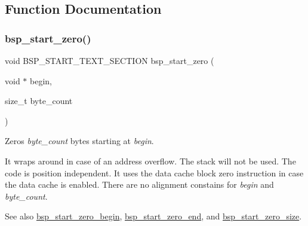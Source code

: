 \subsection{Function Documentation}
\mbox{\label{group__RTEMSBSPsPowerPCSharedStart_ga22b00d272dd9b2ab44e34f0b86245c38}} 
\subsubsection{\texorpdfstring{bsp\_start\_zero()}{bsp\_start\_zero()}}
{\footnotesize\ttfamily void B\+S\+P\+\_\+\+S\+T\+A\+R\+T\+\_\+\+T\+E\+X\+T\+\_\+\+S\+E\+C\+T\+I\+ON bsp\+\_\+start\+\_\+zero (\begin{DoxyParamCaption}\item[{void $\ast$}]{begin,  }\item[{size\+\_\+t}]{byte\+\_\+count }\end{DoxyParamCaption})}

Zeros {\itshape byte\+\_\+count} bytes starting at {\itshape begin}.

It wraps around in case of an address overflow. The stack will not be used. The code is position independent. It uses the data cache block zero instruction in case the data cache is enabled. There are no alignment constains for {\itshape begin} and {\itshape byte\+\_\+count}.

\begin{DoxySeeAlso}{See also}
\mbox{\hyperlink{group__RTEMSBSPsPowerPCSharedStart_gaf57face1aaf6ded232cb769149180ec0}{bsp\+\_\+start\+\_\+zero\+\_\+begin}}, \mbox{\hyperlink{group__RTEMSBSPsPowerPCSharedStart_gaecb8798a00ec268ef022dd747fc5899a}{bsp\+\_\+start\+\_\+zero\+\_\+end}}, and \mbox{\hyperlink{group__RTEMSBSPsPowerPCSharedStart_ga4d5bb66c4502940f07f99b743bd0b1e0}{bsp\+\_\+start\+\_\+zero\+\_\+size}}. 
\end{DoxySeeAlso}
